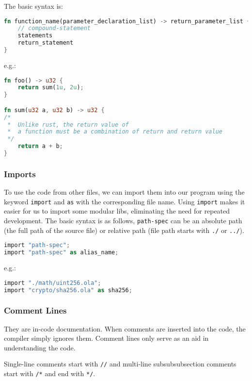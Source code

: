 The basic syntax is:

\begin{lstlisting}[language=rust]
fn function_name(parameter_declaration_list) -> return_parameter_list {
    // compound-statement
    statements
    return_statement
}
\end{lstlisting}

e.g.:

\begin{lstlisting}[language=rust]
fn foo() -> u32 {
    return sum(1u, 2u);
}

fn sum(u32 a, u32 b) -> u32 {
/* 
 *  Unlike rust, the return value of 
 *  a function must be a combination of return and return value
 */
    return a + b;
}
\end{lstlisting}

\subsubsection{Imports}

To use the code from other files, we can import them into our program using the keyword \verb|import| and \verb|as| with the corresponding file name.
Using \verb|import| makes it easier for us to import some modular libs, eliminating the need for repeated development.
The basic syntax is as follows, \verb|path-spec| can be an absolute path (the full path of the source file) or relative path (file path starts with \verb|./| or \verb|../|).

\begin{lstlisting}[language=rust]
import "path-spec";
import "path-spec" as alias_name;
\end{lstlisting}

e.g.:

\begin{lstlisting}[language=rust]
import "./math/uint256.ola";
import "crypto/sha256.ola" as sha256;
\end{lstlisting}

\subsubsection{Comment Lines}

They are in-code documentation. When comments are inserted into the code, the compiler simply ignores them. Comment lines only serve as an aid in understanding the code.

Single-line comments start with \texttt{//} and multi-line subsubsubsection comments start with \texttt{/*} and end with \texttt{*/}.

